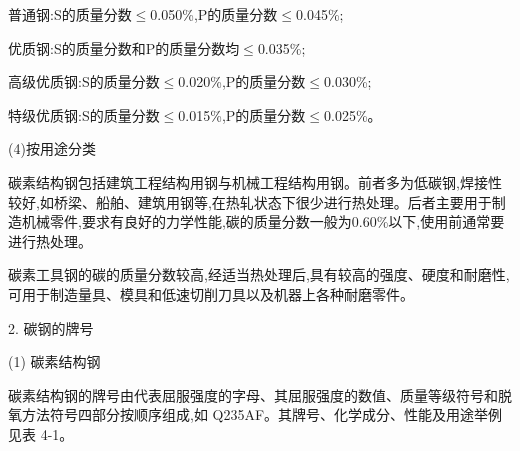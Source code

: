 \documentclass[UTF8]{ctexbook}
\newcommand{\◎}{\ensuremath{\bigcirc}}
\begin{document}
普通钢:S的质量分数$\leqslant$0.050\%,P的质量分数$\leqslant$0.045\%;

优质钢:S的质量分数和P的质量分数均$\leqslant$0.035\%;

高级优质钢:S的质量分数$\leqslant$0.020\%,P的质量分数$\leqslant$0.030\%;

特级优质钢:S的质量分数$\leqslant$0.015\%,P的质量分数$\leqslant$0.025\%。

(4)按用途分类

碳素结构钢包括建筑工程结构用钢与机械工程结构用钢。前者多为低碳钢,焊接性较好,如桥梁、船舶、建筑用钢等,在热轧状态下很少进行热处理。后者主要用于制造机械零件,要求有良好的力学性能,碳的质量分数一般为0.60\%以下,使用前通常要进行热处理。

碳素工具钢的碳的质量分数较高,经适当热处理后,具有较高的强度、硬度和耐磨性,可用于制造量具、模具和低速切削刀具以及机器上各种耐磨零件。

2. 碳钢的牌号

(1) 碳素结构钢

碳素结构钢的牌号由代表屈服强度的字母、其屈服强度的数值、质量等级符号和脱氧方法符号四部分按顺序组成,如 Q235AF。其牌号、化学成分、性能及用途举例见表 4-1。
\end{document}

